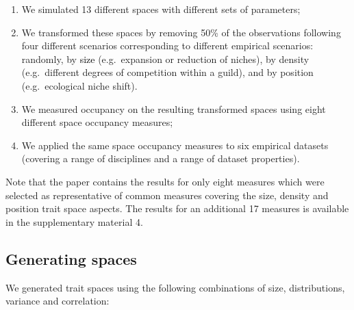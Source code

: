 \documentclass[]{article}
\providecommand{\tightlist}{%
  \setlength{\itemsep}{0pt}\setlength{\parskip}{0pt}}
\begin{document}
\begin{enumerate}
\def\labelenumi{\arabic{enumi}.}
\tightlist
\item
  We simulated 13 different spaces with different sets of parameters;
\item
  We transformed these spaces by removing 50\% of the observations
  following four different scenarios corresponding to different
  empirical scenarios: randomly, by
  \textcolor{black}{size} (e.g.~expansion or reduction
  of niches), by density (e.g.~different degrees of competition within a
  guild), and by position (e.g.~ecological niche shift).
\item
  We measured occupancy on the resulting transformed spaces using eight
  different space occupancy measures;
\item
  We applied the same space occupancy measures to six empirical datasets
  (covering a range of disciplines and a range of dataset properties).
\end{enumerate}

Note that the paper contains the results for only eight measures which
were selected as representative of common measures covering the size,
density and position trait space aspects. The results for an additional
17 measures is available in the supplementary material 4.

\subsection{Generating spaces}\label{generating-spaces}

We generated trait spaces using the following combinations of size,
distributions, variance and correlation:

\renewcommand\baselinestretch{1}\selectfont
\end{document}
